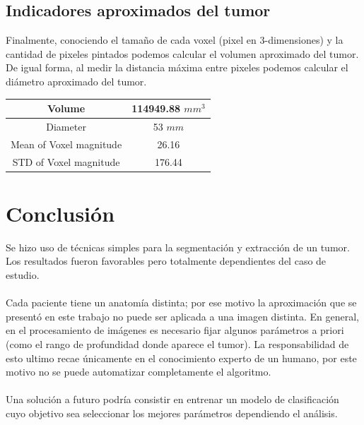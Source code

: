 \documentclass[conference]{IEEEtran}
\begin{document}
\subsection{Indicadores aproximados del tumor}
Finalmente, conociendo el tamaño de cada voxel (pixel en 3-dimensiones) y la cantidad de pixeles pintados podemos calcular el volumen aproximado del tumor. De igual forma, al medir la distancia máxima entre pixeles podemos calcular el diámetro aproximado del tumor. 
  
\begin{center}
\begin{tabular}{|c|c|}
\hline 
Volume & 114949.88 $mm^3$ \\ 
\hline 
Diameter & 53 $mm$ \\ 
\hline 
Mean of Voxel magnitude & 26.16 \\ 
\hline 
STD of Voxel magnitude & 176.44 \\ 
\hline 
\end{tabular} 
\end{center}

\section{Conclusión}
Se hizo uso de técnicas simples para la segmentación y extracción de un tumor. Los resultados fueron favorables pero totalmente dependientes del caso de estudio. \\\\Cada paciente tiene un anatomía distinta; por ese motivo la aproximación que se presentó en este trabajo no puede ser aplicada a una imagen distinta. En general, en el procesamiento de imágenes es necesario fijar algunos parámetros a priori (como el rango de profundidad donde aparece el tumor). La responsabilidad de esto ultimo recae únicamente en el conocimiento experto de un humano, por este motivo no se puede automatizar completamente el algoritmo.\\\\ Una solución a futuro podría consistir en entrenar un modelo de clasificación cuyo objetivo sea seleccionar los mejores parámetros dependiendo el análisis.\\\\\\\\\
\end{document}
